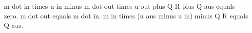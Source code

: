 m dot in times u in minus m dot out times u out plus Q R plus Q aus equals zero.  
m dot out equals m dot in.  
m in times (u aus minus u in) minus Q R equals Q aus.